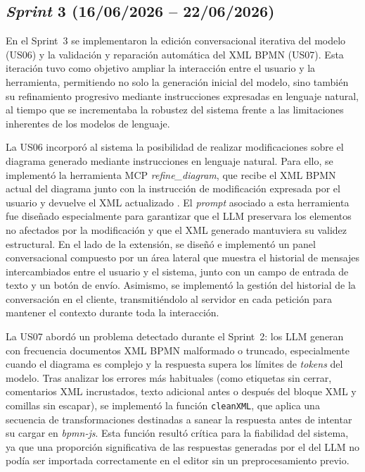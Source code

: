 
\subsection{\textit{Sprint} 3 (16/06/2026 -- 22/06/2026)}
\label{subsec:sprint3}

En el Sprint~3 se implementaron la edición conversacional iterativa del modelo (US06) y la validación y reparación automática del XML BPMN (US07). Esta iteración tuvo como objetivo ampliar la interacción entre el usuario y la herramienta, permitiendo no solo la generación inicial del modelo, sino también su refinamiento progresivo mediante instrucciones expresadas en lenguaje natural, al tiempo que se incrementaba la robustez del sistema frente a las limitaciones inherentes de los modelos de lenguaje.

La US06 incorporó al sistema la posibilidad de realizar modificaciones sobre el diagrama generado mediante instrucciones en lenguaje natural. Para ello, se implementó la herramienta MCP \textit{refine\_diagram}, que recibe el XML BPMN actual del diagrama junto con la instrucción de modificación expresada por el usuario y devuelve el XML actualizado . El \textit{prompt}  asociado a esta herramienta fue  diseñado especialmente para garantizar que el LLM preservara los elementos no afectados por la modificación y que el XML  generado mantuviera su validez estructural. En el lado de la extensión, se diseñó e implementó un  panel conversacional  compuesto por un área lateral que muestra el historial de mensajes intercambiados entre el usuario y el sistema, junto con un campo de entrada de texto y un botón de envío. Asimismo, se  implementó la gestión del historial de la conversación en el cliente, transmitiéndolo al servidor en cada petición para mantener el contexto durante toda la interacción.

La US07 abordó un problema detectado durante el Sprint~2: los LLM generan con frecuencia documentos XML BPMN malformado o truncado, especialmente cuando el diagrama es complejo y la respuesta supera los límites de \textit{tokens} del modelo. Tras analizar los errores más habituales (como etiquetas sin cerrar, comentarios XML incrustados, texto adicional antes o después del bloque XML y comillas sin escapar),  se implementó la función \texttt{cleanXML}, que aplica una secuencia de transformaciones destinadas a sanear la respuesta antes de intentar su cargar en \textit{bpmn-js}. Esta función resultó crítica para la fiabilidad del sistema, ya que una proporción significativa de las respuestas generadas por el del LLM no podía ser importada correctamente en el editor sin un preprocesamiento previo.

